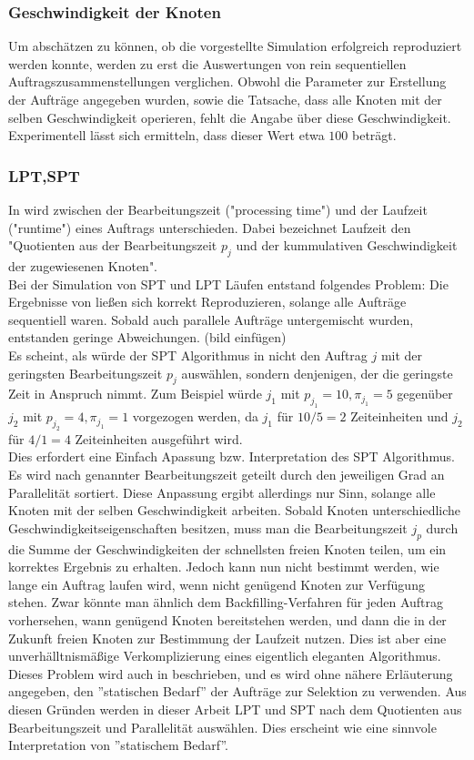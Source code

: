 \subsubsection{Geschwindigkeit der Knoten}
Um abschätzen zu können, ob die vorgestellte Simulation erfolgreich reproduziert werden konnte, werden zu erst die Auswertungen von rein sequentiellen Auftragszusammenstellungen verglichen. Obwohl die Parameter zur Erstellung der Aufträge angegeben wurden, sowie die Tatsache, dass alle Knoten mit der selben Geschwindigkeit operieren, fehlt die Angabe über diese Geschwindigkeit. Experimentell lässt sich ermitteln, dass dieser Wert etwa $100$ beträgt.

\subsubsection{LPT,SPT}
In \cite{Arn99} wird zwischen der Bearbeitungszeit ("processing time") und der Laufzeit ("runtime") eines Auftrags unterschieden. Dabei bezeichnet Laufzeit den "Quotienten aus der Bearbeitungszeit $p_j$ und der kummulativen Geschwindigkeit der zugewiesenen Knoten".\\
Bei der Simulation von SPT und LPT Läufen entstand folgendes Problem: Die Ergebnisse von \cite{Arn99} ließen sich korrekt Reproduzieren, solange alle Aufträge sequentiell waren. Sobald auch parallele Aufträge untergemischt wurden, entstanden geringe Abweichungen. (bild einfügen)\\
Es scheint, als würde der SPT Algorithmus in \cite{Arn99} nicht den Auftrag $j$ mit der geringsten Bearbeitungszeit $p_j$ auswählen, sondern denjenigen, der die geringste Zeit in Anspruch nimmt. Zum Beispiel würde $j_1$ mit $p_{j_1} = 10, \pi_{j_1} = 5$ gegenüber $j_2$ mit $p_{j_2} = 4, \pi_{j_1} = 1$ vorgezogen werden, da $j_1$ für $10/5 = 2$  Zeiteinheiten und $j_2$ für $4/1 = 4$ Zeiteinheiten ausgeführt wird.\\
Dies erfordert eine Einfach Apassung bzw. Interpretation des SPT Algorithmus. Es wird nach genannter Bearbeitungszeit geteilt durch den jeweiligen Grad an Parallelität sortiert. Diese Anpassung ergibt allerdings nur Sinn, solange alle Knoten mit der selben Geschwindigkeit arbeiten. Sobald Knoten unterschiedliche Geschwindigkeitseigenschaften besitzen, muss man die Bearbeitungszeit $j_p$ durch die Summe der Geschwindigkeiten der schnellsten freien Knoten teilen, um ein korrektes Ergebnis zu erhalten. Jedoch kann nun nicht bestimmt werden, wie lange ein Auftrag laufen wird, wenn nicht genügend Knoten zur Verfügung stehen. Zwar könnte man ähnlich dem Backfilling-Verfahren für jeden Auftrag vorhersehen, wann genügend Knoten bereitstehen werden, und dann die in der Zukunft freien Knoten zur Bestimmung der Laufzeit nutzen. Dies ist aber eine unverhälltnismäßige Verkomplizierung eines eigentlich eleganten Algorithmus.\\
Dieses Problem wird auch in \cite{Arn99} beschrieben, und es wird ohne nähere Erläuterung angegeben, den ''statischen Bedarf'' der Aufträge zur Selektion zu verwenden. Aus diesen Gründen werden in dieser Arbeit LPT und SPT nach dem Quotienten aus Bearbeitungszeit und Parallelität auswählen. Dies erscheint wie eine sinnvole Interpretation von ''statischem Bedarf''.
